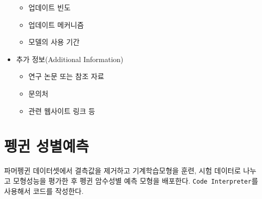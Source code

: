 \documentclass[
  letterpaper,
  chapter,a4paper,showtrims,openright,hidelinks]{oblivoir}
\providecommand{\tightlist}{%
  \setlength{\itemsep}{0pt}\setlength{\parskip}{0pt}}\usepackage{longtable,booktabs,array}
\begin{document}
\begin{itemize}
  \begin{itemize}
  \tightlist
  \item
    업데이트 빈도
  \item
    업데이트 메커니즘
  \item
    모델의 사용 기간
  \end{itemize}
\item
  추가 정보(Additional Information)

  \begin{itemize}
  \tightlist
  \item
    연구 논문 또는 참조 자료
  \item
    문의처
  \item
    관련 웹사이트 링크 등
  \end{itemize}
\end{itemize}

\hypertarget{uxd3aduxadc4-uxc131uxbcc4uxc608uxce21}{%
\section{펭귄 성별예측}\label{uxd3aduxadc4-uxc131uxbcc4uxc608uxce21}}

파머펭귄 데이터셋에서 결측값을 제거하고 기계학습모형을 훈련, 시험
데이터로 나누고 모형성능을 평가한 후 펭귄 암수성별 예측 모형을 배포한다.
\texttt{Code\ Interpreter}를 사용해서 코드를 작성한다.
\end{document}
